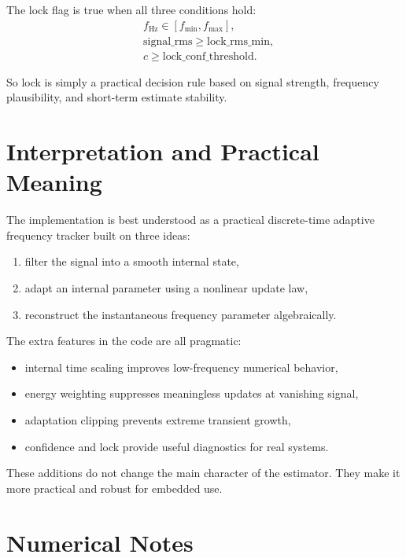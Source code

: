 \documentclass[conference]{IEEEtran}
\begin{document}
    The lock flag is true when all three conditions hold:
    \begin{align}
        &f_{\text{Hz}} \in [f_{\min},f_{\max}],\\
        &\text{signal\_rms} \ge \text{lock\_rms\_min},\\
        &c \ge \text{lock\_conf\_threshold}.
    \end{align}

    So lock is simply a practical decision rule based on signal strength,
    frequency plausibility, and short-term estimate stability.

    \section{Interpretation and Practical Meaning}

    The implementation is best understood as a practical discrete-time adaptive
    frequency tracker built on three ideas:

    \begin{enumerate}
        \item filter the signal into a smooth internal state,
        \item adapt an internal parameter using a nonlinear update law,
        \item reconstruct the instantaneous frequency parameter algebraically.
    \end{enumerate}

    The extra features in the code are all pragmatic:
    \begin{itemize}
        \item internal time scaling improves low-frequency numerical behavior,
        \item energy weighting suppresses meaningless updates at vanishing signal,
        \item adaptation clipping prevents extreme transient growth,
        \item confidence and lock provide useful diagnostics for real systems.
    \end{itemize}

    These additions do not change the main character of the estimator. They make
    it more practical and robust for embedded use.

    \section{Numerical Notes}
\end{document}
